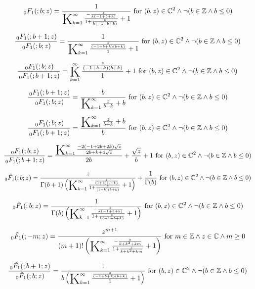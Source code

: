 \documentclass{article}
\newcommand{\bigK}{\mathop{\raisebox{-5pt}{\huge K}}}
\begin{document}
\[\, _0F_1(;b;z)=\frac{1}{\bigK_{k=1}^{\infty}\frac{-\frac{z}{k (-1+b+k)}}{1+\frac{z}{k (-1+b+k)}}+1}\text{ for }(b,z)\in \mathbb{C}^2\land \neg (b\in \mathbb{Z}\land b\leq 0)\] 

\[\frac{\, _0F_1(;b+1;z)}{\, _0F_1(;b;z)}=\frac{1}{\bigK_{k=1}^{\infty}\frac{\frac{z}{(-1+b+k) (b+k)}}{1}+1}\text{ for }(b,z)\in \mathbb{C}^2\land \neg (b\in \mathbb{Z}\land b\leq 0)\] 

\[\frac{\, _0F_1(;b;z)}{\, _0F_1(;b+1;z)}=\bigK_{k=1}^{\infty}\frac{\frac{z}{(-1+b+k) (b+k)}}{1}+1\text{ for }(b,z)\in \mathbb{C}^2\land \neg (b\in \mathbb{Z}\land b\leq 0)\] 

\[\frac{\, _0F_1(;b+1;z)}{\, _0F_1(;b;z)}=\frac{b}{\bigK_{k=1}^{\infty}\frac{z}{b+k}+b}\text{ for }(b,z)\in \mathbb{C}^2\land \neg (b\in \mathbb{Z}\land b\leq 0)\] 

\[\frac{\, _0F_1(;b;z)}{\, _0F_1(;b+1;z)}=\frac{\bigK_{k=1}^{\infty}\frac{z}{b+k}+b}{b}\text{ for }(b,z)\in \mathbb{C}^2\land \neg (b\in \mathbb{Z}\land b\leq 0)\] 

\[\frac{\, _0F_1(;b;z)}{\, _0F_1(;b+1;z)}=\frac{\bigK_{k=1}^{\infty}\frac{-2 (-1+2 b+2 k) \sqrt{z}}{2 b+k+4 \sqrt{z}}}{2 b}+\frac{\sqrt{z}}{b}+1\text{ for }(b,z)\in \mathbb{C}^2\land \neg (b\in \mathbb{Z}\land b\leq 0)\] 

\[\, _0\tilde{F}_1(;b;z)=\frac{z}{\Gamma (b+1) \left(\bigK_{k=1}^{\infty}\frac{-\frac{z}{(1+k) (b+k)}}{1+\frac{z}{(1+k) (b+k)}}+1\right)}+\frac{1}{\Gamma (b)}\text{ for }(b,z)\in \mathbb{C}^2\land \neg (b\in \mathbb{Z}\land b\leq 0)\] 

\[\, _0\tilde{F}_1(;b;z)=\frac{1}{\Gamma (b) \left(\bigK_{k=1}^{\infty}\frac{-\frac{z}{k (-1+b+k)}}{1+\frac{z}{k (-1+b+k)}}+1\right)}\text{ for }(b,z)\in \mathbb{C}^2\land \neg (b\in \mathbb{Z}\land b\leq 0)\] 

\[\, _0\tilde{F}_1(;-m;z)=\frac{z^{m+1}}{(m+1)! \left(\bigK_{k=1}^{\infty}\frac{-\frac{z}{k+k^2+k m}}{1+\frac{z}{k+k^2+k m}}+1\right)}\text{ for }m\in \mathbb{Z}\land z\in \mathbb{C}\land m\geq 0\] 

\[\frac{\, _0\tilde{F}_1(;b+1;z)}{\, _0\tilde{F}_1(;b;z)}=\frac{1}{b \left(\bigK_{k=1}^{\infty}\frac{\frac{z}{(-1+b+k) (b+k)}}{1}+1\right)}\text{ for }(b,z)\in \mathbb{C}^2\land \neg (b\in \mathbb{Z}\land b\leq 0)\] 
\end{document}
